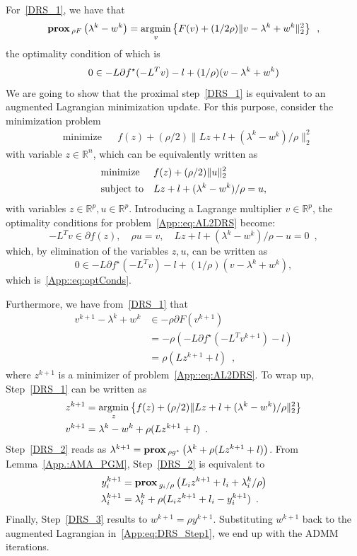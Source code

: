 \documentclass[openany]{now}
\newcommand{\reals}{{\mathbb R}}
\newcommand{\argmin}{\mathop{\rm argmin}}
\newcommand{\prox}{\mathop{\bf prox}}
\begin{document}
For~\eqref{DRS_1}, we have that
\[
\prox{_{\rho F}}\left(\lambda^k-w^k\right) = \underset{v}{\argmin}\left\{F(v)+(1/2\rho)\|v-\lambda^k+w^k\|_2^2\right\}\enspace,
\]
the optimality condition of which is
\begin{equation}{\label{App::eq:optConds}}
 0\in-L\partial f^\star(-L^Tv)-l+(1/\rho)(v-\lambda^k+w^k)
\end{equation}
We are going to show that the proximal step~\eqref{DRS_1} is equivalent to an augmented Lagrangian minimization update.
For this purpose, consider the minimization problem
\begin{equation*}
\begin{aligned}
 & \text{minimize} && f(z) + (\rho/2)\|Lz+l+(\lambda^k-w^k)/\rho\|_2^2
\end{aligned}
\end{equation*}
with variable $z\in\reals^n$, which can be equivalently written as
\begin{equation}{\label{App::eq:AL2DRS}}
\begin{aligned}
 & \text{minimize} && f(z) + (\rho/2)\|u\|_2^2  \\   
 & \text{subject to} && Lz+l+(\lambda^k-w^k)/\rho = u,
\end{aligned}
\end{equation}
with variables $z\in\reals^p,u\in\reals^p$.
Introducing a Lagrange multiplier $v\in\reals^p$, the optimality conditions for problem~\eqref{App::eq:AL2DRS} become:
\[
 -L^Tv \in\partial f(z), \quad \rho u=v, \quad Lz+l+(\lambda^k-w^k)/\rho-u=0\enspace,
\]
which, by elimination of the variables $z,u$, can be written as
\[
0\in-L\partial f^\star(-L^Tv)-l+(1/\rho)(v-\lambda^k+w^k),
\]
which is~\eqref{App::eq:optConds}. 

Furthermore, we have from~\eqref{DRS_1} that 
\begin{align*}
v^{k+1}-\lambda^k+w^k&\in-\rho\partial F(v^{k+1})\\
                     &=-\rho(-L\partial f^\star(-L^Tv^{k+1})-l)\\
                     &= \rho(Lz^{k+1}+l)\enspace,
\end{align*}
where $z^{k+1}$ is a minimizer of problem~\eqref{App::eq:AL2DRS}.
To wrap up, Step~\eqref{DRS_1} can be written as 
\begin{align}
 z^{k+1} \nonumber&= \underset{z}{\argmin}\left\{f(z) + (\rho/2)\|Lz+l+(\lambda^k-w^k)/\rho\|_2^2\right\}\\
 v^{k+1} &= \lambda^k-w^k+\rho(Lz^{k+1}+l)\enspace.{\label{App:eq:DRS_Step1}}
\end{align}
Step~\eqref{DRS_2} reads as $\lambda^{k+1}=\prox{_{\rho g^\star}}\left(\lambda^k+\rho(Lz^{k+1}+l)\right)$. From Lemma~\eqref{App.:AMA_PGM}, Step~\eqref{DRS_2} is equivalent to
\begin{align*}
 y_i^{k+1} &= \prox{_{g_i/\rho}}\left(L_iz^{k+1}+l_i+\lambda_i^k/\rho\right)\\
 \lambda_i^{k+1} &= \lambda_i^k + \rho(L_i z^{k+1} +l_i- y_i^{k+1})\enspace.
\end{align*}
Finally, Step~\eqref{DRS_3} results to $w^{k+1}=\rho y^{k+1}$. Substituting $w^{k+1}$ back to the augmented Lagrangian in~\eqref{App:eq:DRS_Step1}, we end up with the ADMM iterations.
\end{document}
